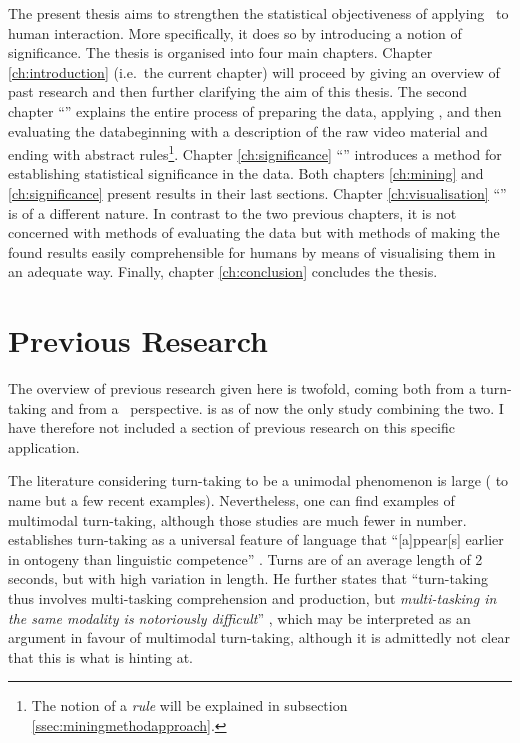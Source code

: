 The present thesis aims to strengthen the statistical objectiveness of applying \fpmlower\ to human interaction. More specifically, it does so by introducing a notion of significance. The thesis is organised into four main chapters.
Chapter \ref{ch:introduction} (i.e.\ the current chapter) will proceed by giving an overview of past research and then further clarifying the aim of this thesis.
The second chapter ``\frequentpatternmining'' explains the entire process of preparing the data, applying \fpmlower, and then evaluating the data\dash beginning with a description of the raw video material and ending with abstract rules\footnote{The notion of a \emph{rule} will be explained in subsection \ref{ssec:miningmethodapproach}.}.
Chapter \ref{ch:significance} ``\significance'' introduces a method for establishing statistical significance in the data. Both chapters \ref{ch:mining} and \ref{ch:significance} present results in their last sections.
Chapter \ref{ch:visualisation} ``\visualisation'' is of a different nature. In contrast to the two previous chapters, it is not concerned with methods of evaluating the data but with methods of making the found results easily comprehensible for humans by means of visualising them in an adequate way.
Finally, chapter \ref{ch:conclusion} concludes the thesis.

\section{Previous Research}
\label{sec:introductionresearch}
The overview of previous research given here is twofold, coming both from a turn-taking and from a \fpmlower\ perspective. \citet{rohlfing18} is as of now the only study combining the two. I have therefore not included a section of previous research on this specific application.


The literature considering turn-taking to be a unimodal phenomenon is large (\citep{casillas16,freud16,heldner10} to name but a few recent examples). Nevertheless, one can find examples of multimodal turn-taking, although those studies are much fewer in number.
\citet{levinson16} establishes turn-taking as a universal feature of language that ``[a]ppear[s] earlier in ontogeny than linguistic competence'' \citep[]{levinson16}. Turns are of an average length of 2 seconds, but with high variation in length. He further states that ``turn-taking thus involves multi-tasking comprehension and production, but \emph{multi-tasking in the same modality is notoriously difficult}'' \citep[, emphasis mine]{levinson16}, which may be interpreted as an argument in favour of multimodal turn-taking, although it is admittedly not clear that this is what \citeauthor{levinson16} is hinting at.%

